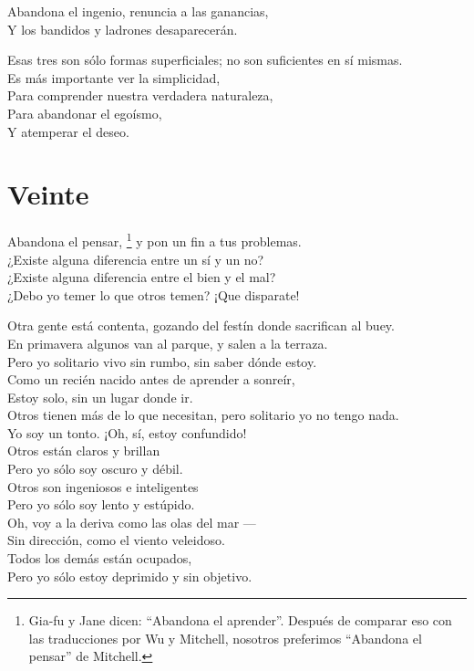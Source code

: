 \documentclass[book,b5paper,hidelinks,final]{memoir}
\begin{document}
	Abandona el ingenio, renuncia a las ganancias,\\
	Y los bandidos y ladrones desaparecerán.
	
	Esas tres son sólo formas superficiales; no son suficientes en sí
	mismas.\\
	Es más importante ver la simplicidad,\\
	Para comprender nuestra verdadera naturaleza,\\
	Para abandonar el egoísmo,\\
	Y atemperar el deseo.
	
	\chapter*{Veinte}
	
	Abandona el pensar, \footnote{Gia-fu y Jane dicen: ``Abandona el aprender''. Después de comparar eso
		con las traducciones por Wu y Mitchell, nosotros preferimos ``Abandona
		el pensar'' de Mitchell.} y pon un fin a tus problemas.\\
	¿Existe alguna diferencia entre un sí y un no?\\
	¿Existe alguna diferencia entre el bien y el mal?\\
	¿Debo yo temer lo que otros temen? ¡Que disparate!
	
	Otra gente está contenta, gozando del festín donde sacrifican al buey.\\
	En primavera algunos van al parque, y salen a la terraza.\\
	Pero yo solitario vivo sin rumbo, sin saber dónde estoy.\\
	Como un recién nacido antes de aprender a sonreír,\\
	Estoy solo, sin un lugar donde ir.\\
	Otros tienen más de lo que necesitan, pero solitario yo no tengo nada.\\
	Yo soy un tonto. ¡Oh, sí, estoy confundido!\\
	Otros están claros y brillan\\
	Pero yo sólo soy oscuro y débil.\\
	Otros son ingeniosos e inteligentes\\
	Pero yo sólo soy lento y estúpido.\\
	Oh, voy a la deriva como las olas del mar ---\\
	Sin dirección, como el viento veleidoso.\\
	Todos los demás están ocupados,\\
	Pero yo sólo estoy deprimido y sin objetivo.
	
\end{document}
